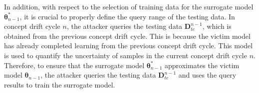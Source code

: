 In addition, with respect to the selection of training data for the surrogate model $\bm{\theta}_{n-1}^{*}$, it is crucial to properly define the query range of the testing data.
In concept drift cycle $n$, the attacker queries the testing data $\bm{D}_{te}^{n-1}$, which is obtained from the previous concept drift cycle.
This is because the victim model has already completed learning from the previous concept drift cycle.
This model is used to quantify the uncertainty of samples in the current concept drift cycle $n$.
Therefore, to ensure that the surrogate model $\bm{\theta}_{n-1}^{*}$ approximates the victim model $\bm{\theta}_{n-1}$, the attacker queries the testing data $\bm{D}_{te}^{n-1}$ and uses the query results to train the surrogate model.


